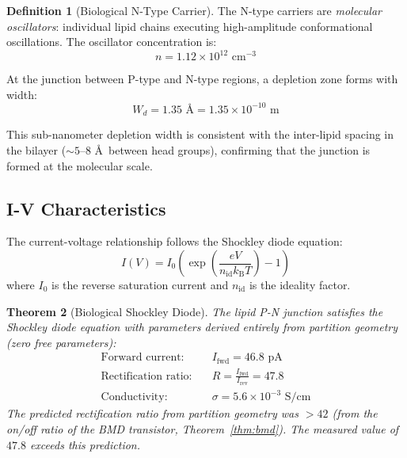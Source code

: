 \documentclass[twocolumn,10pt,a4paper]{article}
\newtheorem{theorem}{Theorem}[section]
\theoremstyle{definition}
\newtheorem{definition}[theorem]{Definition}
\theoremstyle{remark}
\newcommand{\kB}{k_{\mathrm{B}}}
\begin{document}
\begin{definition}[Biological N-Type Carrier]
\label{def:ntype}
The N-type carriers are \emph{molecular oscillators}: individual lipid chains executing high-amplitude conformational oscillations. The oscillator concentration is:
\begin{equation}
\label{eq:ntype}
n = 1.12 \times 10^{12} \text{ cm}^{-3}
\end{equation}
\end{definition}

At the junction between P-type and N-type regions, a depletion zone forms with width:
\begin{equation}
\label{eq:depletion}
W_d = 1.35 \text{ \AA} = 1.35 \times 10^{-10} \text{ m}
\end{equation}

This sub-nanometer depletion width is consistent with the inter-lipid spacing in the bilayer ($\sim 5$--$8$ \AA\ between head groups), confirming that the junction is formed at the molecular scale.

\subsection{I-V Characteristics}

The current-voltage relationship follows the Shockley diode equation:
\begin{equation}
\label{eq:shockley}
I(V) = I_0 \left(\exp\left(\frac{eV}{n_{\mathrm{id}} \kB T}\right) - 1\right)
\end{equation}
where $I_0$ is the reverse saturation current and $n_{\mathrm{id}}$ is the ideality factor.

\begin{theorem}[Biological Shockley Diode]
\label{thm:shockley}
The lipid P-N junction satisfies the Shockley diode equation with parameters derived entirely from partition geometry (zero free parameters):
\begin{align}
\text{Forward current:} &\quad I_{\mathrm{fwd}} = 46.8 \text{ pA} \label{eq:forward_current} \\
\text{Rectification ratio:} &\quad R = \frac{I_{\mathrm{fwd}}}{I_{\mathrm{rev}}} = 47.8 \label{eq:rectification} \\
\text{Conductivity:} &\quad \sigma = 5.6 \times 10^{-3} \text{ S/cm} \label{eq:conductivity}
\end{align}
The predicted rectification ratio from partition geometry was $>42$ (from the on/off ratio of the BMD transistor, Theorem~\ref{thm:bmd}). The measured value of $47.8$ exceeds this prediction.
\end{theorem}
\end{document}
